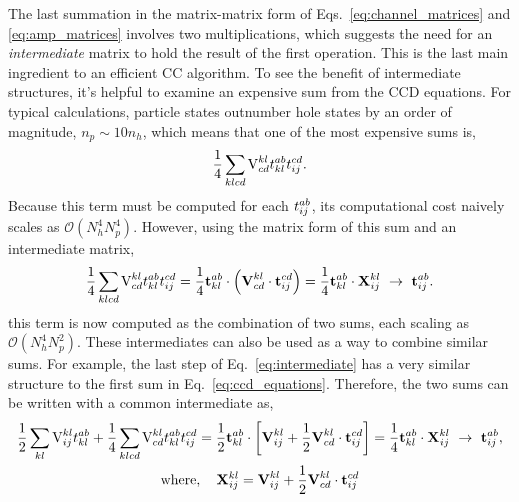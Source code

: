 \documentclass[thesis.tex]{subfiles}
\begin{document}
The last summation in the matrix-matrix form of Eqs.\ \eqref{eq:channel_matrices} and \eqref{eq:amp_matrices} involves two multiplications, which suggests the need for an \textit{intermediate} matrix to hold the result of the first operation.  This is the last main ingredient to an efficient CC algorithm.  To see the benefit of intermediate structures, it's helpful to examine an expensive sum from the CCD equations.  For typical calculations, particle states outnumber hole states by an order of magnitude, $n_{p} \sim 10n_{h}$, which means that one of the most expensive sums is,
\begin{equation}
  \frac{1}{4}\sum\limits_{\mathclap{klcd}}\vint{kl}{cd}\tamp{ab}{kl}\tamp{cd}{ij}.
\end{equation}
Because this term must be computed for each $t^{ab}_{ij}$, its computational cost naively scales as $\mathcal{O}\left( N_{h}^{4}N_{p}^{4}\right)$.  However, using the matrix form of this sum and an intermediate matrix,
\begin{equation} \label{eq:intermediate}
  \frac{1}{4}\sum\limits_{\mathclap{klcd}}\vint{kl}{cd}\tamp{ab}{kl}\tamp{cd}{ij} = \frac{1}{4}\btamp{ab}{kl}\cdot\left(\bvint{kl}{cd}\cdot\btamp{cd}{ij}\right) = \frac{1}{4}\btamp{ab}{kl}\cdot\bxint{kl}{ij}\ \rightarrow\ \btamp{ab}{ij}.
\end{equation}
this term is now computed as the combination of two sums, each scaling as $\mathcal{O}\left( N_{h}^{4}N_{p}^{2}\right)$.  These intermediates can also be used as a way to combine similar sums.  For example, the last step of Eq.\ \ref{eq:intermediate} has a very similar structure to the first sum in Eq.\ \ref{eq:ccd_equations}.  Therefore, the two sums can be written with a common intermediate as,
\begin{gather} \label{eq:intermediate_2}
  \frac{1}{2}\sum\limits_{\mathclap{kl}}\vint{kl}{ij}\tamp{ab}{kl} + \frac{1}{4}\sum\limits_{\mathclap{klcd}}\vint{kl}{cd}\tamp{ab}{kl}\tamp{cd}{ij} = \frac{1}{2}\btamp{ab}{kl}\cdot\left[ \bvint{kl}{ij} + \frac{1}{2}\bvint{kl}{cd}\cdot\btamp{cd}{ij} \right] = \frac{1}{4}\btamp{ab}{kl}\cdot\bxint{kl}{ij}\ \rightarrow\ \btamp{ab}{ij}, \notag \\
  \text{where},\hspace{10pt} \bxint{kl}{ij} = \bvint{kl}{ij} + \frac{1}{2}\bvint{kl}{cd}\cdot\btamp{cd}{ij}
\end{gather}
\end{document}
